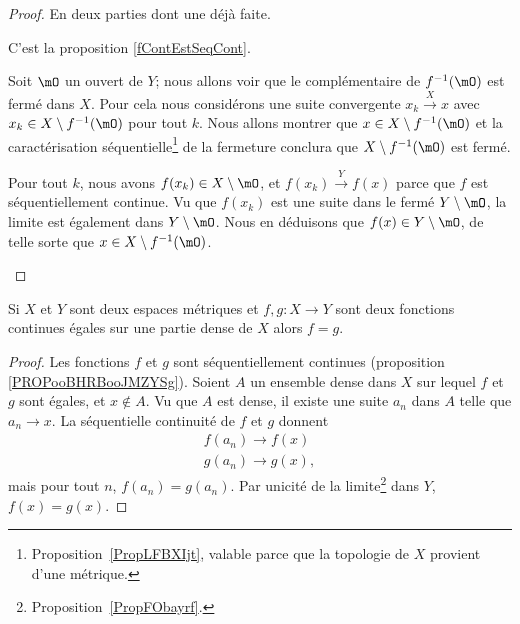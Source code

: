 \begin{proof}
	En deux parties dont une déjà faite.
	\begin{subproof}
		\spitem[\( \Rightarrow\)]
		C'est la proposition \ref{fContEstSeqCont}.

		\spitem[\( \Leftarrow\)]
		Soit \( \mO\) un ouvert de \( Y\); nous allons voir que le complémentaire de \( f^{-1}(\mO)\) est fermé dans \( X\). Pour cela nous considérons une suite convergente \( x_k\stackrel{X}{\longrightarrow} x\) avec \( x_k\in X\setminus f^{-1}(\mO)\) pour tout \( k\). Nous allons montrer que \( x\in X\setminus f^{-1}(\mO)\) et la caractérisation séquentielle\footnote{Proposition~\ref{PropLFBXIjt}, valable parce que la topologie de \( X\) provient d'une métrique.} de la fermeture conclura que \( X\setminus f^{-1}(\mO)\) est fermé.

		Pour tout \( k\), nous avons \( f(x_k)\in X\setminus \mO\), et \( f(x_k)\stackrel{Y}{\longrightarrow} f(x)\) parce que \( f\) est séquentiellement continue. Vu que \( f(x_k)\) est une suite dans le fermé \( Y\setminus \mO\), la limite est également dans \( Y\setminus \mO\). Nous en déduisons que \( f(x)\in Y\setminus \mO\), de telle sorte que \( x\in X\setminus f^{-1}(\mO)\).
	\end{subproof}
\end{proof}

\begin{proposition} \label{PropCJGIooZNpnGF}
	Si \( X\) et \( Y\) sont deux espaces métriques et \( f,g\colon X\to Y\) sont deux fonctions continues égales sur une partie dense de \( X\) alors \( f=g\).
\end{proposition}

\begin{proof}
	Les fonctions \( f\) et \( g\) sont séquentiellement continues (proposition \ref{PROPooBHRBooJMZYSg}). Soient \( A\) un ensemble dense dans \( X\) sur lequel \( f\) et \( g\) sont égales, et \( x\notin A\). Vu que \( A\) est dense, il existe une suite \( a_n\) dans \( A\) telle que \( a_n\to x\). La séquentielle continuité de \( f\) et \( g\) donnent
	\begin{subequations}
		\begin{align}
			f(a_n)\to f(x) \\
			g(a_n)\to g(x),
		\end{align}
	\end{subequations}
	mais pour tout \( n\), \( f(a_n)=g(a_n)\). Par unicité de la limite\footnote{Proposition~\ref{PropFObayrf}.} dans \( Y\), \( f(x)=g(x)\).
\end{proof}



